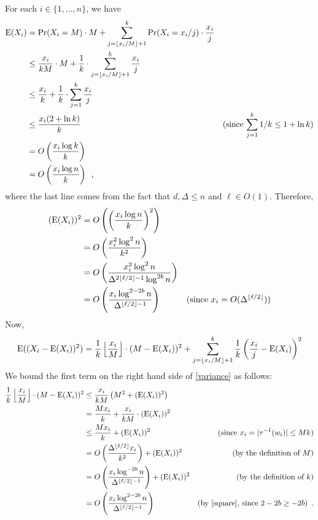 \documentclass{patmorin}
\begin{document}
For each $i\in\{1,\ldots,n\}$, we have
\begin{align*}
  \mathrm{E}(X_i)
  & =\Pr(X_i=M)\cdot M + \sum_{j=\lfloor x_i/M\rfloor+1}^k \Pr(X_i=x_i/j)\cdot\frac{x_i}{j} \\
  & \le\frac{x_i}{kM}\cdot M + \frac{1}{k}\cdot\sum_{j=\lfloor x_i/M\rfloor+1}^k \frac{x_i}{j} \\
  & \le\frac{x_i}{k} + \frac{1}{k}\cdot\sum_{j=1}^k \frac{x_i}{j} \\
  & \le \frac{x_i(2+\ln k)}{k} & \text{(since $\sum_{j=1}^k 1/k\le 1+\ln k$)} \\
  & = O\left(\frac{x_i\log k}{k}\right) \\
  & = O\left(\frac{x_i\log n}{k}\right)
  \enspace ,
\end{align*}
where the last line comes from the fact that $d,\Delta \le n$ and $\ell\in O(1)$.
Therefore,
\begin{align}
  (\mathrm{E}(X_i))^2
  & = O\left(\left(\frac{x_i\log n}{k}\right)^2\right) \nonumber \\
  & = O\left(\frac{x_i^2\log^2 n}{k^2}\right) \nonumber \\
  & = O\left(\frac{x_i^2\log^2 n}{\Delta^{2\lfloor\ell/2\rfloor-1}\log^{2b} n}\right) \nonumber \\
  & = O\left(\frac{x_i\log^{2-2b} n}{\Delta^{\lfloor\ell/2\rfloor-1}}\right)
   & \text{(since $x_i=O(\Delta^{\lfloor\ell/2\rfloor})$)} \label{square}
\end{align}
Now,
\begin{equation}
  \mathrm{E}((X_i-\mathrm{E}(X_i))^2)  = \frac{1}{k}\left\lfloor\frac{x_i}{M}\right\rfloor\cdot(M-\mathrm{E}(X_i))^2 + \sum_{j=\lfloor x_i/M\rfloor+1}^k \frac{1}{k}\left(\frac{x_i}{j}-\mathrm{E}(X_i)\right)^2 \label{variance}
\end{equation}
We bound the first term on the right hand side of \cref{variance} as follows:
\begin{align*}
  \frac{1}{k}\left\lfloor\frac{x_i}{M}\right\rfloor\cdot(M-\E(X_i))^2
  & \le \frac{x_i}{kM}\left(M^2 + (\E(X_i))^2\right) \\
  & = \frac{M x_i}{k} + \frac{x_i}{kM}\cdot (\E(X_i))^2 \\
  & \le \frac{M x_i}{k} + (\E(X_i))^2
  & \text{(since $x_i=|\tau^{-1}(w_i)|\le Mk$)}\\
  & = O\left(\frac{\Delta^{\lfloor\ell/2\rfloor}x_i}{k^2}\right) + (\E(X_i))^2
  & \text{(by the definition of $M$)}\\
  & = O\left(\frac{x_i\log^{-2b} n}{\Delta^{\lfloor\ell/2\rfloor-1}}\right) + (\E(X_i))^2
  & \text{(by the definition of $k$)}\\
  & = O\left(\frac{x_i\log^{2-2b} n}{\Delta^{\lfloor\ell/2\rfloor-1}}\right)
  & \text{(by \cref{square}, since $2-2b\ge -2b$)} \enspace .
\end{align*}
\end{document}

